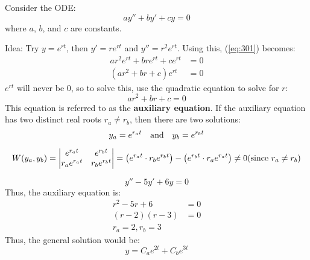 \documentclass[12pt]{article}
\begin{document}
\subsubsection{}
\label{sssec:}

Consider the ODE:
\begin{equation}
  ay'' + by' + cy = 0
  \label{eq:301}
\end{equation}
where $a$, $b$, and $c$ are constants.

Idea: Try $y=e^{rt}$, then $y'=re^{rt}$ and $y''=r^2e^{rt}$. Using this, (\ref{eq:301}) becomes:
\begin{align*}
  ar^2e^{rt} + bre^{rt} + ce^{rt} &= 0 \\
  \left(ar^2 + br + c \right) e^{rt} &= 0
\end{align*}
$e^{rt}$ will never be $0$, so to solve this, use the quadratic equation to solve for $r$:
\begin{equation*}
  ar^2 + br + c = 0
\end{equation*}
This equation is referred to as the \textbf{auxiliary equation}. If the auxiliary equation has two distinct real roots $r_a \neq r_b$, then there are two solutions:
\begin{equation*}
  y_a = e^{r_at}\ \ \ \textup{and}\ \ \ y_b = e^{r_bt}
\end{equation*}

\begin{equation*}
  W(y_a,y_b) = 
  \begin{vmatrix}
    e^{r_at} & e^{r_bt} \\
    r_ae^{r_at} & r_be^{r_bt} \\
  \end{vmatrix} = 
  \left( e^{r_at} \cdot r_be^{r_bt} \right) - \left( e^{r_bt} \cdot r_ae^{r_at} \right) \neq 0 (\textup{since $r_a \neq r_b$})
\end{equation*}

\begin{example}
  \begin{equation*}
    y'' - 5y' + 6y = 0
  \end{equation*}
  Thus, the auxiliary equation is:
  \begin{align*}
    r^2 - 5r + 6 &= 0 \\
    (r-2)(r-3) &= 0 \\
    r_a = 2, r_b = 3
  \end{align*}
  Thus, the general solution would be:
  \begin{equation*}
    y = C_ae^{2t} + C_be^{3t}
  \end{equation*}
\end{example}
\end{document}
